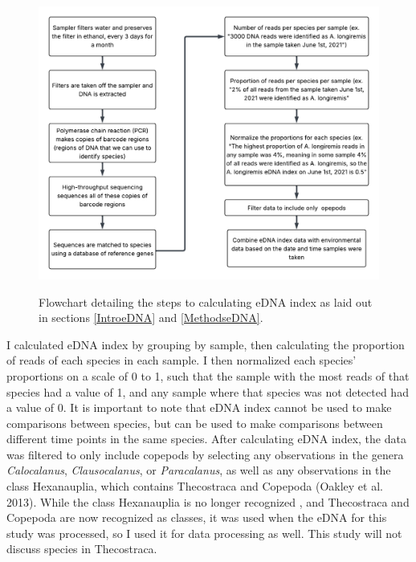 \documentclass[12pt,twoside]{reedthesis}
\begin{document}
	\begin{figure}[!h]
		\begin{center}
			\includegraphics[scale=0.8]{Fig_MethodsFlowchart} \\
			\caption[Methods]{Flowchart detailing the steps to calculating eDNA index as laid out in sections \ref{IntroeDNA} and \ref{MethodseDNA}.} %
			\label{Flowchart}
		\end{center}
	\end{figure} 
	
	I calculated eDNA index by grouping by sample, then calculating the proportion of reads of each species in each sample. I then normalized each species' proportions on a scale of 0 to 1, such that the sample with the most reads of that species had a value of 1, and any sample where that species was not detected had a value of 0. It is important to note that eDNA index cannot be used to make comparisons between species, but can be used to make comparisons between different time points in the same species. After calculating eDNA index, the data was filtered to only include copepods by selecting any observations in the genera \textit{Calocalanus}, \textit{Clausocalanus}, or \textit{Paracalanus}, as well as any observations in the class Hexanauplia, which contains Thecostraca and Copepoda (Oakley et al. 2013). While the class Hexanauplia is no longer recognized \autocite{WoRMSWorldRegister, Lozano-Fernandez2019}, and Thecostraca and Copepoda are now recognized as classes, it was used when the eDNA for this study was processed, so I used it for data processing as well. This study will not discuss species in Thecostraca.
\end{document}
